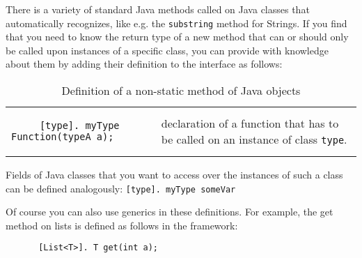 There is a variety of standard Java methods called on Java classes that \vonda automatically recognizes, like e.g. the \texttt{substring} method for Strings. If you find that you need \vonda to know the return type of a new method that can or should only be called upon instances of a specific class, you can provide \vonda with knowledge about them by adding their definition to the interface as follows:


\begin{table}[htbp]
  \centering
  \small
  \begin{tabular}{lp{}}

    \begin{lstlisting}
     [type]. myType Function(typeA a);
    \end{lstlisting}
    & declaration of a function that has to be called on an instance of class \texttt{type}.
  \end{tabular}

  \caption{Definition of a non-static method of Java objects}
  \label{tab:methoddef}
\end{table}

Fields of Java classes that you want to access over the instances of such a class can be defined analogously: \texttt{[type]. myType someVar}

Of course you can also use generics in these definitions. For example, the get method on lists is defined as follows in the \vonda framework:

\begin{figure}[htbp]
\centering
\small
\begin{lstlisting}
 [List<T>]. T get(int a);
\end{lstlisting}
\end{figure}
%



